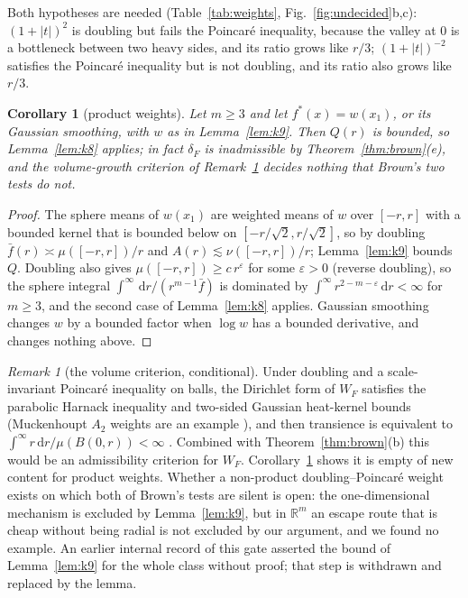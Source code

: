 \documentclass[a4paper,11pt,noarxiv]{quantumarticle}
\newcommand{\R}{\mathbb{R}}
\newcommand{\abs}[1]{\lvert #1\rvert}
\newcommand{\dd}{\,\mathrm{d}}
\newcommand{\fbar}{\bar f}
\theoremstyle{plain}
\newtheorem{corollary}[proposition]{Corollary}
\theoremstyle{definition}
\theoremstyle{remark}
\newtheorem{remark}[proposition]{Remark}
\begin{document}
Both hypotheses are needed (Table~\ref{tab:weights},
Fig.~\ref{fig:undecided}b,c): $(1+\abs t)^2$ is doubling but fails the
Poincar\'e inequality, because the valley at $0$ is a bottleneck
between two heavy sides, and its ratio grows like $r/3$;
$(1+\abs t)^{-2}$ satisfies the Poincar\'e inequality but is not
doubling, and its ratio also grows like $r/3$.

\begin{corollary}[product weights]\label{cor:product}
Let $m\ge3$ and let $f^*(x)=w(x_1)$, or its Gaussian smoothing, with
$w$ as in Lemma~\ref{lem:k9}. Then $Q(r)$ is bounded, so
Lemma~\ref{lem:k8} applies; in fact $\delta_F$ is inadmissible by
Theorem~\ref{thm:brown}(e), and the volume-growth criterion of
Remark~\ref{rem:volume} decides nothing that Brown's two tests do not.
\end{corollary}

\begin{proof}
The sphere means of $w(x_1)$ are weighted means of $w$ over $[-r,r]$
with a bounded kernel that is bounded below on $[-r/\sqrt2,r/\sqrt2]$,
so by doubling $\fbar(r)\asymp\mu([-r,r])/r$ and
$A(r)\lesssim\nu([-r,r])/r$; Lemma~\ref{lem:k9} bounds $Q$. Doubling
also gives $\mu([-r,r])\ge c\,r^{\varepsilon}$ for some
$\varepsilon>0$ (reverse doubling), so the sphere integral
$\int^\infty\dd r/(r^{m-1}\fbar)$ is dominated by
$\int^\infty r^{2-m-\varepsilon}\dd r<\infty$ for $m\ge3$, and the
second case of Lemma~\ref{lem:k8} applies.
Gaussian smoothing changes $w$ by a bounded factor when $\log w$ has a
bounded derivative, and changes nothing above.
\end{proof}

\begin{remark}[the volume criterion, conditional]\label{rem:volume}
Under doubling and a scale-invariant Poincar\'e inequality on balls,
the Dirichlet form of $W_F$ satisfies the parabolic Harnack inequality
and two-sided Gaussian heat-kernel bounds
\cite{grigoryan1991,saloffcoste1992,sturm1996} (Muckenhoupt $A_2$
weights are an example \cite{fks1982}), and then transience is
equivalent to $\int^\infty r\dd r/\mu(B(0,r))<\infty$
\cite[Thm.\ 11.1 and its proof]{grigoryan1999}. Combined with
Theorem~\ref{thm:brown}(b) this would be an admissibility criterion
for $W_F$. Corollary~\ref{cor:product} shows it is empty of new content
for product weights. Whether a non-product doubling--Poincar\'e weight
exists on which both of Brown's tests are silent is open: the
one-dimensional mechanism is excluded by Lemma~\ref{lem:k9}, but in
$\R^m$ an escape route that is cheap without being radial is not
excluded by our argument, and we found no example. An earlier internal
record of this gate asserted the bound of Lemma~\ref{lem:k9} for the
whole class without proof; that step is withdrawn and replaced by the
lemma.
\end{remark}
\end{document}
